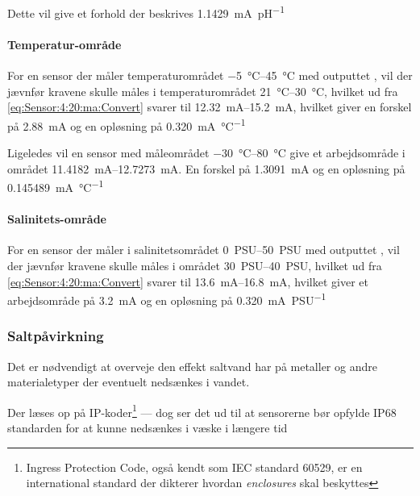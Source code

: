 Dette vil give et forhold der beskrives \SI{1.1429}{\milli\ampere\per\textrm{pH}}

\paragraph{Temperatur-område}
For en sensor der måler temperaturområdet \SIrange{-5}{45}{\celsius} med outputtet \fourtwenty\cite{OxyGuardTemperaturesensor}, vil der jævnfør kravene skulle måles i temperaturområdet \SIrange{21}{30}{\celsius}, hvilket ud fra \eqref{eq:Sensor:4:20:ma:Convert} svarer til \SIrange{12.32}{15.2}{mA}, hvilket giver en forskel på \SI{2.88}{mA} og en opløsning på \SI{0.320}{\milli\ampere\per\celsius}


Ligeledes vil en sensor med måleområdet \SIrange{-30}{80}{\celsius} give et arbejdsområde i området \SIrange{11.4182}{12.7273}{mA}. En forskel på \SI{1.3091}{mA} og en opløsning på \SI{0.145489}{\milli\ampere\per\celsius}

\paragraph{Salinitets-område}
For en sensor der måler i salinitetsområdet \SIrange{0}{50}{PSU} med outputtet \fourtwenty\cite{OxyGuardSalinitysensor}, vil der jævnfør kravene skulle måles i området \SIrange{30}{40}{PSU}, hvilket ud fra \eqref{eq:Sensor:4:20:ma:Convert} svarer til \SIrange{13.6}{16.8}{mA}, hvilket giver et arbejdsområde på \SI{3.2}{mA} og en opløsning på \SI{0.320}{\milli\ampere\per\textrm{PSU}}






\subsubsection{Saltpåvirkning}

Det er nødvendigt at overveje den effekt saltvand har på metaller og andre materialetyper der eventuelt nedsænkes i vandet.

Der læses op på IP-koder\footnote{Ingress Protection Code, også kendt som IEC standard 60529, er en international standard der dikterer hvordan \emph{enclosures} skal beskyttes\tbd} --- dog ser det ud til at sensorerne bør opfylde IP68 standarden for at kunne nedsænkes i væske i længere tid \cite{IPstandardsIEC}

